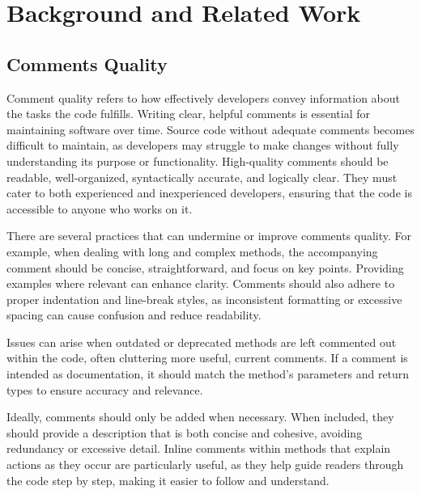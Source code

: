 
\chapter{Background and Related Work} %

\label{Chapter2} 

\section{Comments Quality}
Comment quality refers to how effectively developers convey information about the tasks the code fulfills. Writing clear, helpful comments is essential for maintaining software over time. Source code without adequate comments becomes difficult to maintain, as developers may struggle to make changes without fully understanding its purpose or functionality. High-quality comments should be readable, well-organized, syntactically accurate, and logically clear. They must cater to both experienced and inexperienced developers, ensuring that the code is accessible to anyone who works on it.

\noindent There are several practices that can undermine or improve comments quality. For example, when dealing with long and complex methods, the accompanying comment should be concise, straightforward, and focus on key points. Providing examples where relevant can enhance clarity. Comments should also adhere to proper indentation and line-break styles, as inconsistent formatting or excessive spacing can cause confusion and reduce readability.

\noindent Issues can arise when outdated or deprecated methods are left commented out within the code, often cluttering more useful, current comments. If a comment is intended as documentation, it should match the method’s parameters and return types to ensure accuracy and relevance.

\noindent Ideally, comments should only be added when necessary. When included, they should provide a description that is both concise and cohesive, avoiding redundancy or excessive detail. Inline comments within methods that explain actions as they occur are particularly useful, as they help guide readers through the code step by step, making it easier to follow and understand.

